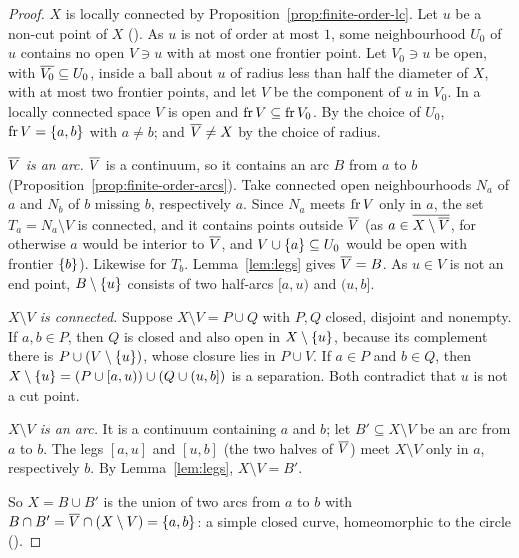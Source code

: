 \begin{proof}
$X$ is locally connected by Proposition~\ref{prop:finite-order-lc}. Let $u$ be a non-cut point of $X$ (). As $u$ is
not of order at most $1$, some neighbourhood $U_0$ of $u$ contains no open $V\ni u$ with at most one frontier point. Let $V_0\ni u$ be
open, with $\overline{V_0}\subseteq U_0$, inside a ball about $u$ of radius less than half the diameter of $X$, with at most two frontier points, and
let $V$ be the component of $u$ in $V_0$. In a locally connected space $V$ is open and $\operatorname{fr} V\subseteq\operatorname{fr} V_0$. By the choice of $U_0$,
$\operatorname{fr} V=\left\{ a,b \right\}$ with $a\ne b$; and $\overline{V}\ne X$ by the choice of radius.

\emph{$\overline{V}$ is an arc.} $\overline{V}$ is a continuum, so it contains an arc $B$ from $a$ to $b$ (Proposition~\ref{prop:finite-order-arcs}). Take
connected open neighbourhoods $N_a$ of $a$ and $N_b$ of $b$ missing $b$, respectively $a$. Since $N_a$ meets $\operatorname{fr} V$ only in $a$, the set
$T_a=N_a\setminus V$ is connected, and it contains points outside $\overline{V}$ (as $a\in\overline{X\setminus\overline{V}}$, for otherwise $a$ would be
interior to $\overline{V}$, and $V\cup\left\{ a \right\}\subseteq U_0$ would be open with frontier $\left\{ b \right\}$). Likewise for $T_b$. Lemma~\ref{lem:legs} gives
$\overline{V}=B$. As $u\in V$ is not an end point, $B\setminus\left\{ u \right\}$ consists of two half-arcs $[a,u)$ and $(u,b]$.

\emph{$X\setminus V$ is connected.} Suppose $X\setminus V=P\cup Q$ with $P,Q$ closed, disjoint and nonempty. If $a,b\in P$, then $Q$ is closed and
also open in $X\setminus\left\{ u \right\}$, because its complement there is $P\cup(V\setminus\left\{ u \right\})$, whose closure lies in $P\cup V$. If $a\in P$ and
$b\in Q$, then $X\setminus\left\{ u \right\}=(P\cup[a,u))\cup(Q\cup(u,b])$ is a separation. Both contradict that $u$ is not a cut point.

\emph{$X\setminus V$ is an arc.} It is a continuum containing $a$ and $b$; let $B'\subseteq X\setminus V$ be an arc from $a$ to $b$. The legs
$[a,u]$ and $[u,b]$ (the two halves of $\overline{V}$) meet $X\setminus V$ only in $a$, respectively $b$. By Lemma~\ref{lem:legs}, $X\setminus V=B'$.

So $X=B\cup B'$ is the union of two arcs from $a$ to $b$ with $B\cap B'=\overline{V}\cap(X\setminus V)=\left\{ a,b \right\}$: a simple closed curve,
homeomorphic to the circle ().
\end{proof}


